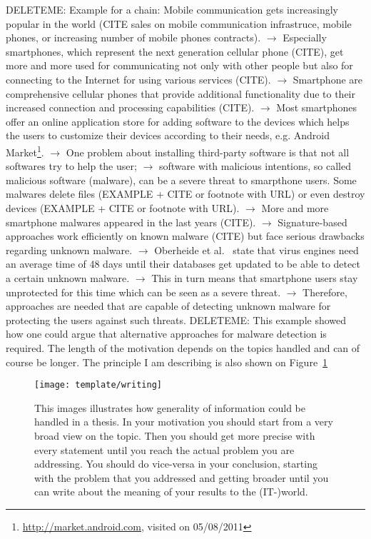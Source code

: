 DELETEME: Example for a chain: Mobile communication gets increasingly popular in the world (CITE sales on mobile communication infrastruce, mobile phones, or increasing number of mobile phones contracts). $\rightarrow$ Especially smartphones, which represent the next generation cellular phone (CITE), get more and more used for communicating not only with other people but also for connecting to the Internet for using various services (CITE). $\rightarrow$ Smartphone are comprehensive cellular phones that provide additional functionality due to their increased connection and processing capabilities (CITE). $\rightarrow$ Most smartphones offer an online application store for adding software to the devices which helps the users to customize their devices according to their needs, e.g. Android Market\footnote{\url{http://market.android.com}, visited on 05/08/2011}. $\rightarrow$ One problem about installing third-party software is that not all softwares try to help the user; $\rightarrow$ software with malicious intentions, so called malicious software (malware), can be a severe threat to smarpthone users. Some malwares delete files (EXAMPLE + CITE or footnote with URL) or even destroy devices (EXAMPLE + CITE or footnote with URL). $\rightarrow$ More and more smartphone malwares appeared in the last years (CITE). $\rightarrow$ Signature-based approaches work efficiently on known malware (CITE) but face serious drawbacks regarding unknown malware. $\rightarrow$ Oberheide et al.~\cite{oberheide:2008:cloudav} state that virus engines need an average time of 48 days until their databases get updated to be able to detect a certain unknown malware. $\rightarrow$ This in turn means that smartphone users stay unprotected for this time which can be seen as a severe threat. $\rightarrow$ Therefore, approaches are needed that are capable of detecting unknown malware for protecting the users against such threats.
DELETEME: This example showed how one could argue that alternative approaches for malware detection is required. The length of the motivation depends on the topics handled and can of course be longer. The principle I am describing is also shown on Figure~\ref{fig:writing}

\begin{figure}
\centering
\texttt{[image: template/writing]}
\caption[Information Generality]{This images illustrates how generality of information could be handled in a thesis. In your motivation you should start from a very broad view on the topic. Then you should get more precise with every statement until you reach the actual problem you are addressing. You should do vice-versa in your conclusion, starting with the problem that you addressed and getting broader until you can write about the meaning of your results to the (IT-)world.\label{fig:writing}}
\end{figure}


